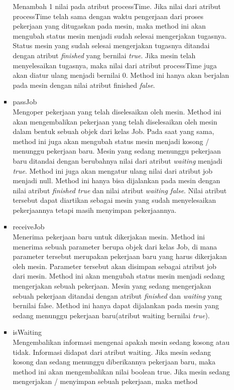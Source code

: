 \begin{itemize}
\begin{itemize}
\begin{itemize}
				Menambah 1 nilai pada atribut processTime. Jika nilai dari atribut processTime
				telah sama dengan waktu pengerjaan dari proses pekerjaan yang ditugaskan pada
				mesin, maka method ini akan mengubah status mesin menjadi sudah selesai mengerjakan
				tugasnya. Status mesin yang sudah selesai mengerjakan tugasnya ditandai
				dengan atribut \textit{finished} yang bernilai \textit{true}. Jika mesin telah menyelesaikan tugasnya,
				maka nilai dari atribut processTime juga akan diatur ulang menjadi bernilai 0.
				Method ini hanya akan berjalan pada mesin dengan nilai atribut finished \textit{false}.
				\item passJob \\
				Mengoper pekerjaan yang telah diselesaikan oleh mesin. Method ini akan mengembalikan
				pekerjaan yang telah diselesaikan oleh mesin dalam bentuk sebuah objek dari
				kelas Job. Pada saat yang sama, method ini juga akan mengubah status mesin menjadi
				kosong / menunggu pekerjaan baru. Mesin yang sedang menunggu pekerjaan
				baru ditandai dengan berubahnya nilai dari atribut \textit{waiting} menjadi \textit{true}. Method ini
				juga akan mengatur ulang nilai dari atribut job menjadi null. Method ini hanya bisa
				dijalankan pada mesin dengan nilai atribut \textit{finished true} dan nilai atribut \textit{waiting false}. 
				Nilai atribut tersebut dapat diartikan sebagai mesin yang sudah menyelesaikan pekerjaannya tetapi masih menyimpan pekerjaannya.
				\item receiveJob \\
				Menerima pekerjaan baru untuk dikerjakan mesin. Method ini menerima sebuah
				parameter berupa objek dari kelas Job, di mana parameter tersebut merupakan pekerjaan
				baru yang harus dikerjakan oleh mesin. Parameter tersebut akan disimpan
				sebagai atribut job dari mesin. Method ini akan mengubah status mesin menjadi
				sedang mengerjakan sebuah pekerjaan. Mesin yang sedang mengerjakan sebuah pekerjaan
				ditandai dengan atribut \textit{finished} dan \textit{waiting} yang bernilai false. Method ini
				hanya dapat dijalankan pada mesin yang sedang menunggu pekerjaan baru(atribut waiting bernilai \textit{true}).
				\item isWaiting \\
				Mengembalikan informasi mengenai apakah mesin sedang kosong atau tidak. Informasi
				didapat dari atribut waiting. Jika mesin sedang kosong dan sedang menunggu
				diberikannya pekerjaan baru, maka method ini akan mengembalikan nilai boolean
				true. Jika mesin sedang mengerjakan / menyimpan sebuah pekerjaan, maka method

\end{itemize}
\end{itemize}
\end{itemize}
